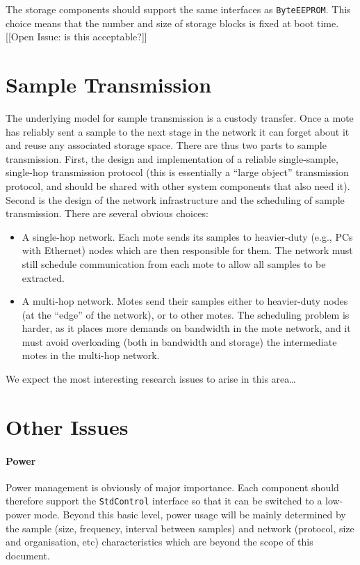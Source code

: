 \documentclass{article}
\newcommand{\code}[1]{{\tt #1}}
\begin{document}
The storage components should support the same interfaces as
\code{ByteEEPROM}. This choice means that the number and size of storage
blocks is fixed at boot time. [[Open Issue: is this acceptable?]]

\section{Sample Transmission}

The underlying model for sample transmission is a custody transfer. Once a
mote has reliably sent a sample to the next stage in the network it can
forget about it and reuse any associated storage space. There are thus two
parts to sample transmission. First, the design and implementation of a
reliable single-sample, single-hop transmission protocol (this is
essentially a ``large object'' transmission protocol, and should be shared
with other system components that also need it).  Second is the design of
the network infrastructure and the scheduling of sample transmission. There
are several obvious choices:
\begin{itemize}
\item A single-hop network. Each mote sends its samples to heavier-duty
(e.g., PCs with Ethernet) nodes which are then responsible for them. The
network must still schedule communication from each mote to allow all
samples to be extracted.

\item A multi-hop network. Motes send their samples either to heavier-duty
nodes (at the ``edge'' of the network), or to other motes. The scheduling
problem is harder, as it places more demands on bandwidth in the mote network,
and it must avoid overloading (both in bandwidth and storage) the intermediate
motes in the multi-hop network.
\end{itemize}

We expect the most interesting research issues to arise in this area\ldots

\section{Other Issues}

\paragraph{Power}
Power management is obviously of major importance. Each component should
therefore support the \code{StdControl} interface so that it can be
switched to a low-power mode. Beyond this basic level, power usage will be
mainly determined by the sample (size, frequency, interval between samples)
and network (protocol, size and organisation, etc) characteristics which
are beyond the scope of this document.
\end{document}
